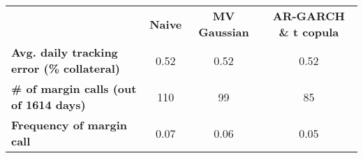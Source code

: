 \begin{small}\begin{tabular}{ l c c c }
&\textbf{Naive}&\textbf{MV Gaussian}&\textbf{AR-GARCH \& t copula}\\
\textbf{Avg. daily tracking error (\% collateral)}&0.52&0.52&0.52\\
\textbf{\# of margin calls (out of 1614 days)}&110&99&85\\
\textbf{Frequency of margin call}&0.07&0.06&0.05\\
\end{tabular}
\end{small}
